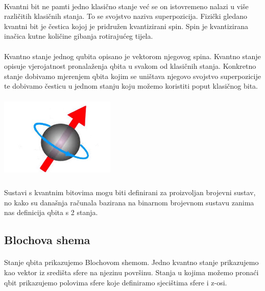 \documentclass[times, utf8, zavrsni]{fer}
\begin{document}
\paragraph{}
Kvantni bit ne pamti jedno klasično stanje već se on istovremeno nalazi u više različitih klasičnih stanja. To se svojstvo naziva superpozicija. Fizički gledano kvantni bit je čestica kojoj je pridružen kvantizirani spin. Spin je kvantizirana inačica kutne količine gibanja rotirajućeg tijela.

\paragraph{}
Kvantno stanje jednog qubita opisano je vektorom njegovog spina. Kvantno stanje opisuje vjerojatnost pronalaženja qbita u svakom od klasičnih stanja. Konkretno stanje dobivamo mjerenjem qbita kojim se uništava njegovo svojstvo superpozicije te dobivamo česticu u jednom stanju koju možemo koristiti poput klasičnog bita.

\begin{center}
\includegraphics[width=55mm, height=40mm]{spin}
\end{center}

\paragraph{}
Sustavi s kvantnim bitovima mogu biti definirani za proizvoljan brojevni sustav, no kako su današnja računala bazirana na binarnom brojevnom sustavu zanima nas definicija qbita s 2 stanja.

\subsection{Blochova shema}
\paragraph{}
Stanje qbita prikazujemo Blochovom shemom. Jedno kvantno stanje prikazujemo kao vektor iz središta sfere na njezinu površinu. Stanja u kojima možemo pronaći qbit prikazujemo polovima sfere koje definiramo sjecištima sfere i z-osi.
\end{document}
